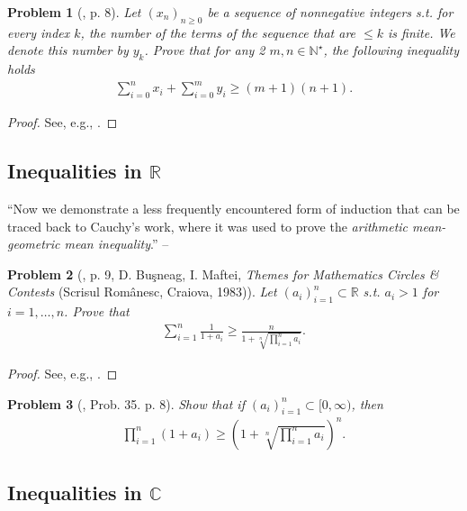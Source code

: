 \documentclass[oneside]{book}
\numberwithin{equation}{section}
\newtheorem{problem}{Problem}[section]
\begin{document}
\begin{problem}[\cite{Gelca_Andreescu2017}, p. 8]
	Let $(x_n)_{n\ge 0}$ be a sequence of nonnegative integers s.t. for every index $k$, the number of the terms of the sequence that are $\le k$ is finite. We denote this number by $y_k$. Prove that for any 2 $m,n\in\mathbb{N}^\star$, the following inequality holds
	\begin{align*}
		\sum_{i=0}^n x_i + \sum_{i=0}^m y_i\ge(m + 1)(n + 1).
	\end{align*}
\end{problem}

\begin{proof}[Proof]
	See, e.g., \cite[pp. 8--9]{Gelca_Andreescu2017}.
\end{proof}

\subsection{Inequalities in $\mathbb{R}$}
``Now we demonstrate a less frequently encountered form of induction that can be traced back to Cauchy's work, where it was used to prove the \textit{arithmetic mean-geometric mean inequality}.'' -- \cite[p. 9]{Gelca_Andreescu2017}

\begin{problem}[\cite{Gelca_Andreescu2017}, p. 9, D. Buşneag, I. Maftei, \textit{Themes for Mathematics Circles \& Contests} (Scrisul Românesc, Craiova, 1983)]
	Let $(a_i)_{i=1}^n\subset\mathbb{R}$ s.t. $a_i > 1$ for $i = 1,\ldots,n$. Prove that
	\begin{align*}
		\sum_{i=1}^n \frac{1}{1 + a_i}\ge\frac{n}{1 + \sqrt[n]{\prod_{i=1}^n a_i}}.
	\end{align*}
\end{problem}

\begin{proof}[Proof]
	See, e.g., \cite[pp. 9--10]{Gelca_Andreescu2017}.
\end{proof}

\begin{problem}[\cite{Gelca_Andreescu2017}, Prob. 35. p. 8]
	Show that if $(a_i)_{i=1}^n\subset[0,\infty)$, then
	\begin{align*}
		\prod_{i=1}^n (1 + a_i)\ge\left(1 + \sqrt[n]{\prod_{i=1}^n a_i}\right)^n.
	\end{align*}
\end{problem}

\subsection{Inequalities in $\mathbb{C}$}
\end{document}
